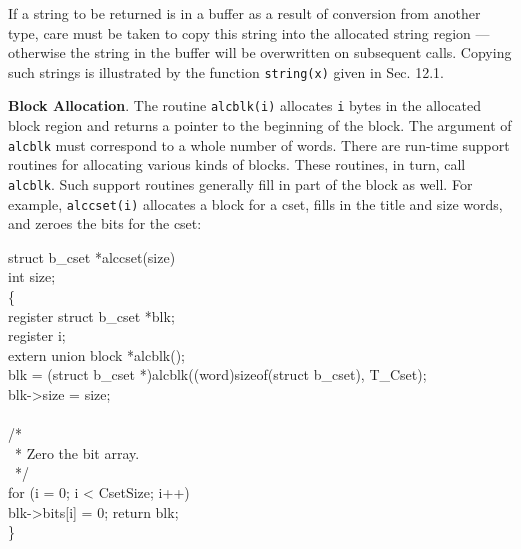 If a string to be returned is in a buffer as a result of conversion
from another type, care must be taken to copy this string into the
allocated string region --- otherwise the string in the buffer will
be overwritten on subsequent calls. Copying such strings is
illustrated by the function \texttt{string(x)} given in Sec. 12.1.

\textbf{Block Allocation}. The routine \texttt{alcblk(i)} allocates
\texttt{i} bytes in the allocated block region and returns a pointer to the
beginning of the block. The argument of \texttt{alcblk} must correspond to
a whole number of words. There are run-time support routines for allocating
various kinds of blocks. These routines, in turn, call \texttt{alcblk}.
Such support routines generally fill in part of the block as well. For
example, \texttt{alccset(i)} allocates a block for a cset, fills in the
title and size words, and zeroes the bits for the cset:
\goodbreak
\begin{iconcode}
struct b\_cset *alccset(size)\\
int size;\\
\{\\
\>register struct b\_cset *blk;\\
\>register i;\\
\>extern union block *alcblk();\\
\>blk = (struct b\_cset *)alcblk((word)sizeof(struct b\_cset), T\_Cset);\\
\>blk->size = size;\\
\\
\>/*\\
\>\ * Zero the bit array.\\
\>\ */\\
\>for (i = 0; i < CsetSize; i++)\\
\>\>blk->bits[i] = 0; return blk;\\
\}
\end{iconcode}


